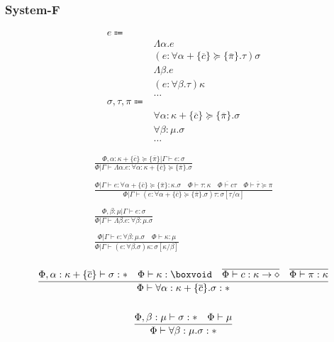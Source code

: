\documentclass {article}
\begin{document}
\subsubsection{System-F}
\begin{align*}
e \Coloneqq & \\
& \Lambda \alpha. e \tag{Type Lambda} \\
& (e : \forall \alpha + \{ \overline c \} \succeq \{ \overline \pi \}. \tau) \sigma \tag{Type Application} \\
& \Lambda \beta. e \tag{Kind Lambda} \\
& (e : \forall \beta. \tau) \kappa \tag{Kind Application} \\
& \dots \\
\sigma, \tau, \pi \Coloneqq & \\
& \forall \alpha : \kappa + \{ \overline c \} \succeq \{ \overline \pi \}. \sigma \tag{Type Forall}\\ 
& \forall \beta : \mu. \sigma \tag{Kind Forall}\\
& \dots
\end{align*}

\begin{gather*}
\frac
{\Phi, \alpha : \kappa + \{ \overline c \} \succeq \{ \overline \pi \} | \Gamma \vdash e : \sigma}
{\Phi | \Gamma \vdash \Lambda \alpha. e : \forall \alpha : \kappa + \{ \overline c\} \succeq \{ \overline \pi \} . \sigma } \\
\\
\frac
{\Phi | \Gamma \vdash e : \forall \alpha + \{ \overline c \} \succeq \{ \overline \pi \} : \kappa. \sigma \quad \Phi \vdash \tau : \kappa \quad \overline {\Phi \vdash c \tau} \quad \overline { \Phi \vdash \tau \succeq \pi }}
{\Phi | \Gamma \vdash (e : \forall \alpha + \{ \overline c \} \succeq \{ \overline \pi \}. \sigma) \tau : \sigma [\tau/\alpha] } \\
\\
\frac
{\Phi, \beta : \mu | \Gamma \vdash e : \sigma}
{\Phi | \Gamma \vdash \Lambda \beta. e : \forall \beta : \mu. \sigma} \\
\\
\frac
{\Phi | \Gamma \vdash e : \forall \beta : \mu. \sigma \quad \Phi \vdash \kappa : \mu}
{\Phi | \Gamma \vdash (e : \forall \beta. \sigma) \kappa : \sigma [\kappa/\beta]} \\
\end{gather*}

\begin{gather*}
\frac
{\Phi, \alpha : \kappa + \{ \overline c \} \vdash \sigma : * \quad \Phi \vdash \kappa : \boxvoid \quad \overline { \Phi \vdash c : \kappa \to \diamond} \quad \overline { \Phi \vdash \pi : \kappa }}
{\Phi \vdash \forall \alpha : \kappa + \{ \overline c \}. \sigma : * } \\
\\
\frac
{\Phi, \beta : \mu \vdash \sigma : * \quad \Phi \vdash \mu}
{\Phi \vdash \forall \beta : \mu. \sigma : * } \\
\end{gather*}
\end{document}
